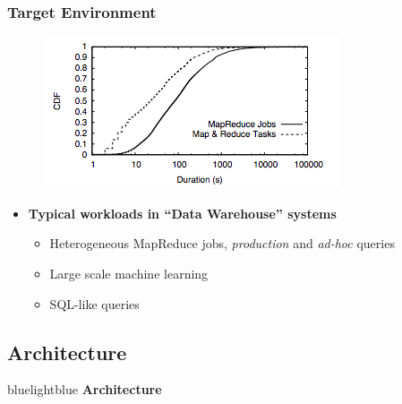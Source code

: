 \begin{frame}
\frametitle{Target Environment}
\begin{figure}[h]
  \centering
  \includegraphics[scale=0.6]{./figures/mesos_workload}
  \label{fig:mesos_workload}
\end{figure}

\begin{itemize}
	\item {\bf Typical workloads in ``Data Warehouse'' systems}
	\begin{itemize}
		\item Heterogeneous MapReduce jobs, {\it production} and {\it ad-hoc} queries
		\item Large scale machine learning
		\item SQL-like queries
	\end{itemize}
\end{itemize}
\end{frame}

\subsection{Architecture}
\begin{frame}
 \begin{colorblock}{blue}{lightblue}{ }
    \Large \textbf{Architecture}
  \end{colorblock}
\end{frame}

